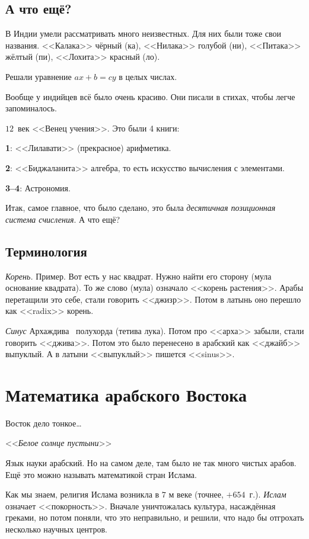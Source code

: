 \documentclass[a4paper,oneside,fleqn,10pt]{article}
\begin{document}
\subsection{А что ещё?}

В Индии умели рассматривать много неизвестных.  Для них были тоже свои
названия.  <<Калака>> чёрный (ка), <<Нилака>> голубой (ни), <<Питака>>
жёлтый (пи), <<Лохита>> красный (ло).

Решали уравнение $ax + b = cy$ в целых числах.

Вообще у индийцев всё было очень красиво. Они писали в стихах, чтобы
легче запоминалось.

$12$~век 
    <<Венец учения>>. Это были 4 книги:

\textbf{1}: <<Лилавати>> (прекрасное) арифметика.

\textbf{2}: <<Биджаланита>> алгебра, то есть искусство вычисления с
элементами.

\textbf{3--4}: Астрономия.

Итак, самое главное, что было сделано, это была \emph{десятичная
  позиционная система счисления}.  А что ещё?

\subsection{Терминология}

\emph{Корень.} Пример. Вот есть у нас квадрат. Нужно найти его сторону
(мула основание квадрата).  То же слово (мула) означало <<корень
растения>>. Арабы перетащили это себе, стали говорить <<джизр>>. Потом
в латынь оно перешло как <<radix>> корень.

\emph{Синус}  Архаждива~ полухорда (тетива лука).  Потом про <<арха>>
забыли, стали говорить <<джива>>.  Потом это было перенесено в
арабский как <<джайб>> выпуклый. А в латыни <<выпуклый>> пишется
<<sinus>>.

\section{Математика арабского Востока}

\epigraph{ Восток дело тонкое\ldots\hskip1cm} {<<\emph{Белое солнце
    пустыни}>>}

Язык науки арабский. Но на самом деле, там было не так много чистых
арабов. Ещё это можно называть математикой стран Ислама.

Как мы знаем, религия Ислама возникла в $7$ м веке (точнее,
$+654$~г.). \emph{Ислам} означает <<покорность>>.  Вначале
уничтожалась культура, насаждённая греками, но потом поняли, что это
неправильно, и решили, что надо бы отгрохать несколько научных
центров.
\end{document}
